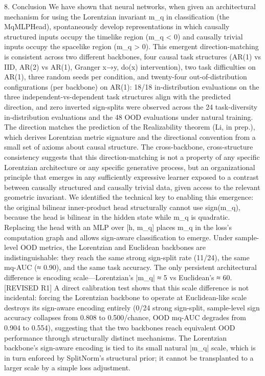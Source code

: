 8. Conclusion
We have shown that neural networks, when given an architectural mechanism for using the Lorentzian invariant m_q in classification (the MqMLPHead), spontaneously develop representations in which causally structured inputs occupy the timelike region (m_q < 0) and causally trivial inputs occupy the spacelike region (m_q > 0). This emergent direction-matching is consistent across two different backbones, four causal task structures (AR(1) vs IID, AR(2) vs AR(1), Granger x→y, do(x) intervention), two task difficulties on AR(1), three random seeds per condition, and twenty-four out-of-distribution configurations (per backbone) on AR(1): 18/18 in-distribution evaluations on the three independent-vs-dependent task structures align with the predicted direction, and zero inverted sign-splits were observed across the 24 task-diversity in-distribution evaluations and the 48 OOD evaluations under natural training.
The direction matches the prediction of the Realizability theorem (Li, in prep.), which derives Lorentzian metric signature and the directional convention from a small set of axioms about causal structure. The cross-backbone, cross-structure consistency suggests that this direction-matching is not a property of any specific Lorentzian architecture or any specific generative process, but an organizational principle that emerges in any sufficiently expressive learner exposed to a contrast between causally structured and causally trivial data, given access to the relevant geometric invariant.
We identified the technical key to enabling this emergence: the original bilinear inner-product head structurally cannot use sign(m_q), because the head is bilinear in the hidden state while m_q is quadratic. Replacing the head with an MLP over [h, m_q] places m_q in the loss's computation graph and allows sign-aware classification to emerge.
Under sample-level OOD metrics, the Lorentzian and Euclidean backbones are indistinguishable: they reach the same strong sign-split rate (11/24), the same mq-AUC (≈ 0.90), and the same task accuracy. The only persistent architectural difference is encoding scale—Lorentzian's |m_q| ≈ 5 vs Euclidean's ≈ 60. [REVISED R1] A direct calibration test shows that this scale difference is not incidental: forcing the Lorentzian backbone to operate at Euclidean-like scale destroys its sign-aware encoding entirely (0/24 strong sign-split, sample-level sign accuracy collapses from 0.808 to 0.500/chance, OOD mq-AUC degrades from 0.904 to 0.554), suggesting that the two backbones reach equivalent OOD performance through structurally distinct mechanisms. The Lorentzian backbone's sign-aware encoding is tied to its small natural |m_q| scale, which is in turn enforced by SplitNorm's structural prior; it cannot be transplanted to a larger scale by a simple loss adjustment.
